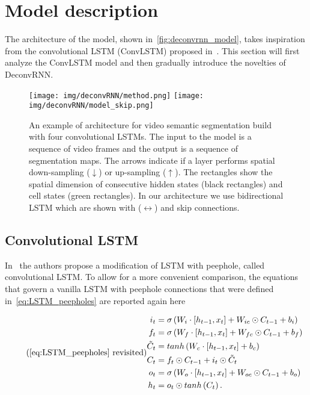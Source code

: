 

\section{Model description}\label{sec:deconvrnn_model}

The architecture of the model, shown in~\autoref{fig:deconvrnn_model}, takes
inspiration from the convolutional LSTM (ConvLSTM) proposed in~\cite{
ShiCWYWW15}. This section will first analyze the ConvLSTM model and then
gradually introduce the novelties of DeconvRNN.

\begin{figure}[t]
    \centering
    \texttt{[image: img/deconvRNN/method.png]}
    \texttt{[image: img/deconvRNN/model\_skip.png]}
    \caption{An example of architecture for video semantic segmentation build
        with four convolutional LSTMs. The input to the model is a sequence of
        video frames and the output is a sequence of segmentation maps. The
        arrows indicate if a layer performs spatial down-sampling
        ($\downarrow$) or up-sampling ($\uparrow$). The rectangles show the
        spatial dimension of consecutive hidden states (black rectangles) and
        cell states (green rectangles). In our architecture we use
        bidirectional LSTM which are shown with ($\leftrightarrow$) and skip
        connections.}\label{fig:deconvrnn_model}
\end{figure}


\subsection{Convolutional LSTM}

In~\cite{ShiCWYWW15} the authors propose a modification of LSTM with
peephole, called convolutional LSTM. To allow for a more convenient comparison,
the equations that govern a vanilla LSTM with peephole connections that were
defined in~\autoref{eq:LSTM_peepholes} are reported again here

\begin{equation*}\tag{\ref{eq:LSTM_peepholes} revisited}
\begin{split}
    i_t &= \sigma\left(W_i \cdot \left[h_{t-1}, x_t\right] +
        W_{ic} \hadamard C_{t-1} + b_i \right)\\
    f_t &= \sigma\left(W_f \cdot \left[h_{t-1}, x_t\right] +
        W_{fc} \hadamard C_{t-1} + b_f \right)\\
    \tilde C_t &= tanh \left(W_c \cdot \left[h_{t-1}, x_t\right] + b_c \right)\\
    C_t &= f_t \hadamard C_{t-1} + i_t \hadamard \tilde C_t\\
    o_t &= \sigma\left(W_o \cdot \left[h_{t-1}, x_t\right] +
        W_{oc} \hadamard C_{t-1} + b_o \right)\\
    h_t &= o_t \hadamard tanh \left(C_t\right).
\end{split}
\end{equation*}

